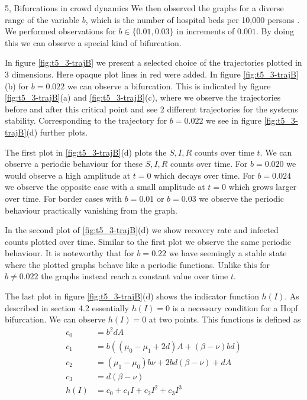 \begin{task}{5, Bifurcations in crowd dynamics}
We then observed the graphs for a diverse range of the variable $b$, which is the number of hospital beds per 10,000 persons \cite{shan2014bifurcations}. We performed observations for $b\in\{ 0.01, 0.03\}$ in increments of $0.001$. By doing this we can observe a special kind of bifurcation.

In figure \ref{fig:t5_3-trajB} we present a selected choice of the trajectories plotted in 3 dimensions. Here opaque plot lines in red were added. In figure \ref{fig:t5_3-trajB}(b) for $b=0.022$ we can observe a bifurcation. This is indicated by figure \ref{fig:t5_3-trajB}(a) and \ref{fig:t5_3-trajB}(c), where we observe the trajectories before and after this critical point and see 2 different trajectories for the systems stability. Corresponding to the trajectory for $b=0.022$ we see in figure \ref{fig:t5_3-trajB}(d) further plots.

The first plot in \ref{fig:t5_3-trajB}(d) plots the $S,I,R$ counts over time $t$. We can observe a periodic behaviour for these $S,I,R$ counts over time. For $b=0.020$ we would observe a high amplitude at $t=0$ which decays over time. For $b=0.024$ we observe the opposite case with a small amplitude at $t=0$ which grows larger over time. For border cases with $b=0.01$ or $b=0.03$ we observe the periodic behaviour practically vanishing from the graph.

In the second plot of \ref{fig:t5_3-trajB}(d) we show recovery rate and infected counts plotted over time. Similar to the first plot we observe the same periodic behaviour. It is noteworthy that for $b=0.22$ we have seemingly a stable state where the plotted graphs behave like a periodic functions. Unlike this for $b\neq 0.022$ the graphs instead reach a constant value over time $t$.

The last plot in figure \ref{fig:t5_3-trajB}(d) shows the indicator function $h(I)$. As described in \cite{shan2014bifurcations} section 4.2 essentially $h(I)=0$ is a necessary condition for a Hopf bifurcation. We can observe $h(I)=0$ at two points. This functions is defined as
\begin{align*}
    c_0 &= b^2dA\\
    c_1 &= b((\mu_0 -\mu_1 +2d)A + (\beta -\nu )bd)\\
    c_2 &= (\mu_1 -\mu_0)b\nu + 2bd(\beta-\nu)+dA\\
    c_3 &= d(\beta -\nu )\\
    h(I) &= c_0 + c_1 I + c_2 I^2 + c_3 I^3
\end{align*}


\end{task}
